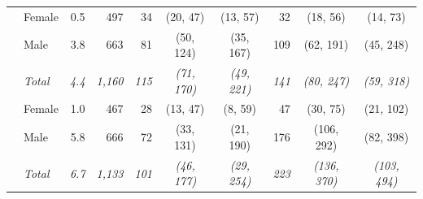 \begin{table}[H]
{\begin{tabular}{llrr rcc rcc}
\addlinespace
2023 & Female & 0.5 & 497 & 34 & (20, 47) & (13, 57) & 32 & (18, 56) & (14, 73) \\
 & Male & 3.8 & 663 & 81 & (50, 124) & (35, 167) & 109 & (62, 191) & (45, 248) \\
{\itshape } & {\itshape Total} & {\itshape 4.4} & {\itshape 1,160} & {\itshape 115} & {\itshape (71, 170)} & {\itshape (49, 221)} & {\itshape 141} & {\itshape (80, 247)} & {\itshape (59, 318)} \\
\addlinespace
2024 & Female & 1.0 & 467 & 28 & (13, 47) & (8, 59) & 47 & (30, 75) & (21, 102) \\
 & Male & 5.8 & 666 & 72 & (33, 131) & (21, 190) & 176 & (106, 292) & (82, 398) \\
{\itshape } & {\itshape Total} & {\itshape 6.7} & {\itshape 1,133} & {\itshape 101} & {\itshape (46, 177)} & {\itshape (29, 254)} & {\itshape 223} & {\itshape (136, 370)} & {\itshape (103, 494)} \\
\bottomrule
\end{tabular}
}
\end{table}

